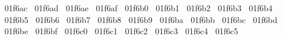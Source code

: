 {  ^^^^^^01f6ac%
  ^^^^^^01f6ad%
  ^^^^^^01f6ae%
  ^^^^^^01f6af%
  ^^^^^^01f6b0%
  ^^^^^^01f6b1%
  ^^^^^^01f6b2%
  ^^^^^^01f6b3%
  ^^^^^^01f6b4%
  ^^^^^^01f6b5%
  ^^^^^^01f6b6%
  ^^^^^^01f6b7%
  ^^^^^^01f6b8%
  ^^^^^^01f6b9%
  ^^^^^^01f6ba%
  ^^^^^^01f6bb%
  ^^^^^^01f6bc%
  ^^^^^^01f6bd%
  ^^^^^^01f6be%
  ^^^^^^01f6bf%
  ^^^^^^01f6c0%
  ^^^^^^01f6c1%
  ^^^^^^01f6c2%
  ^^^^^^01f6c3%
  ^^^^^^01f6c4%
  ^^^^^^01f6c5%
  ^^00}
\lst@RestoreCatcodes
\makeatother
